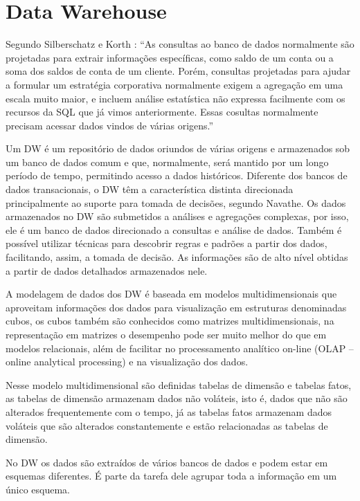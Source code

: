 \chapter{\textbf{Data Warehouse}}

Segundo Silberschatz e Korth \cite{Silber}: “As consultas ao banco de dados normalmente 
são projetadas para extrair informações específicas, como saldo de um conta ou a soma
dos saldos de conta de um cliente. Porém, consultas projetadas para ajudar a 
formular um estratégia corporativa normalmente exigem a agregação em uma escala
muito maior, e incluem análise estatística não expressa facilmente com os 
recursos da SQL que já vimos anteriormente. Essas cosultas normalmente precisam 
acessar dados vindos de várias origens.”

Um DW é um repositório de dados oriundos de várias origens e armazenados sob um
banco de dados comum e que, normalmente, será mantido por um longo período de
tempo, permitindo acesso a dados históricos. Diferente dos bancos de dados
transacionais, o DW têm a característica distinta direcionada principalmente ao
suporte para tomada de decisões, segundo Navathe\cite{Navathe}. Os dados armazenados no
DW são submetidos a análises e agregações complexas, por isso, ele é um banco de
dados direcionado a consultas e análise de dados. Também é possível utilizar
técnicas para descobrir regras e padrões a partir dos dados, facilitando, assim,
a tomada de decisão. As informações são de alto nível obtidas a partir de dados
detalhados armazenados nele.

A modelagem de dados dos DW é baseada em modelos multidimensionais que 
aproveitam informações dos dados para visualização em estruturas denominadas
cubos, os cubos também são conhecidos como matrizes multidimensionais, na
representação em matrizes o desempenho pode ser muito melhor do que em modelos
relacionais, além de facilitar no processamento analítico on-line (OLAP – online
analytical processing) e na visualização dos dados.

Nesse modelo multidimensional são definidas tabelas de dimensão e tabelas fatos,
as tabelas de dimensão armazenam dados não voláteis, isto é, dados que não são
alterados frequentemente com o tempo, já as tabelas fatos armazenam dados
voláteis que são alterados constantemente e estão relacionadas as tabelas de
dimensão.

No DW os dados são extraídos de vários bancos de dados e podem estar em 
esquemas diferentes. É parte da tarefa dele agrupar toda a informação em um
único esquema.

